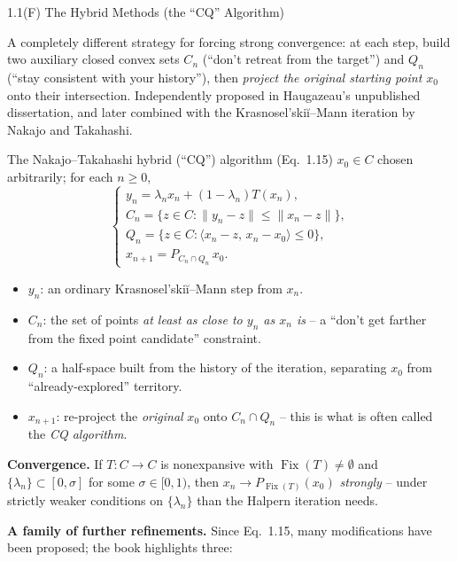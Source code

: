 \documentclass[aspectratio=169,10pt]{beamer}
\newcommand{\Fix}{\operatorname{Fix}}
\begin{document}
\begin{frame}[allowframebreaks]{1.1(F) The Hybrid Methods (the ``CQ'' Algorithm)}

A completely different strategy for forcing strong convergence: at each
step, build two auxiliary closed convex sets $C_n$ (``don't retreat from
the target'') and $Q_n$ (``stay consistent with your history''), then
\emph{project the original starting point $x_0$} onto their intersection.
Independently proposed in Haugazeau's unpublished dissertation, and later
combined with the Krasnosel'ski\u{i}--Mann iteration by Nakajo and
Takahashi.

\begin{block}{The Nakajo--Takahashi hybrid (``CQ'') algorithm (Eq.\ 1.15)}
$x_0\in C$ chosen arbitrarily; for each $n\ge0$,
\[
  \begin{cases}
    y_n = \lambda_n x_n + (1-\lambda_n)T(x_n),\\
    C_n = \{z\in C: \|y_n-z\|\le\|x_n-z\|\},\\
    Q_n = \{z\in C: \langle x_n-z,\,x_n-x_0\rangle\le 0\},\\
    x_{n+1} = P_{C_n\cap Q_n}\,x_0.
  \end{cases}
\]
\begin{itemize}
  \item $y_n$: an ordinary Krasnosel'ski\u{i}--Mann step from $x_n$.
  \item $C_n$: the set of points \emph{at least as close to $y_n$ as
    $x_n$ is} -- a ``don't get farther from the fixed point candidate''
    constraint.
  \item $Q_n$: a half-space built from the history of the iteration,
    separating $x_0$ from ``already-explored'' territory.
  \item $x_{n+1}$: re-project the \emph{original} $x_0$ onto
    $C_n\cap Q_n$ -- this is what is often called the \emph{CQ algorithm}.
\end{itemize}
\end{block}

\framebreak

\textbf{Convergence.} If $T:C\to C$ is nonexpansive with
$\Fix(T)\ne\emptyset$ and $\{\lambda_n\}\subset[0,\sigma]$ for some
$\sigma\in[0,1)$, then $x_n\to P_{\Fix(T)}(x_0)$ \emph{strongly} -- under
strictly weaker conditions on $\{\lambda_n\}$ than the Halpern iteration
needs.

\textbf{A family of further refinements.} Since Eq.\ 1.15, many
modifications have been proposed; the book highlights three:


\end{frame}
\end{document}
